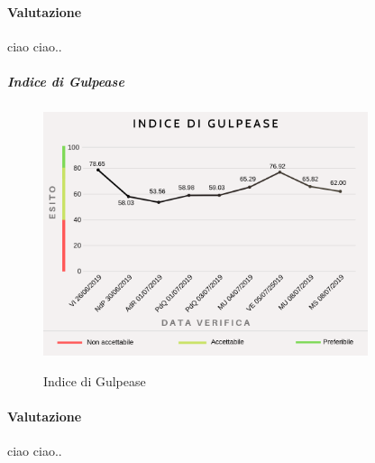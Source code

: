 	\paragraph*{Valutazione} ciao ciao..
	\pagebreak
	\subparagraph{Indice di Gulpease}
	\begin{center}
		\begin{figure}[h] 
			\centering 
			\includegraphics[width=0.85\textwidth]{res/images/new/gulpease.png}\\
			\caption{Indice di Gulpease}
		\end{figure}
	\end{center}
	\paragraph*{Valutazione} ciao ciao..
	\pagebreak
	
